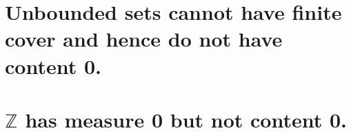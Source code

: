\begin{solution}
    \begin{parts}
        \part{
    Unbounded sets cannot have finite cover
    and hence do not have content 0.
        }
        \part{
    $\mathbb{Z}$ has measure 0 but not
    content 0.
        }
    \end{parts}


\end{solution}